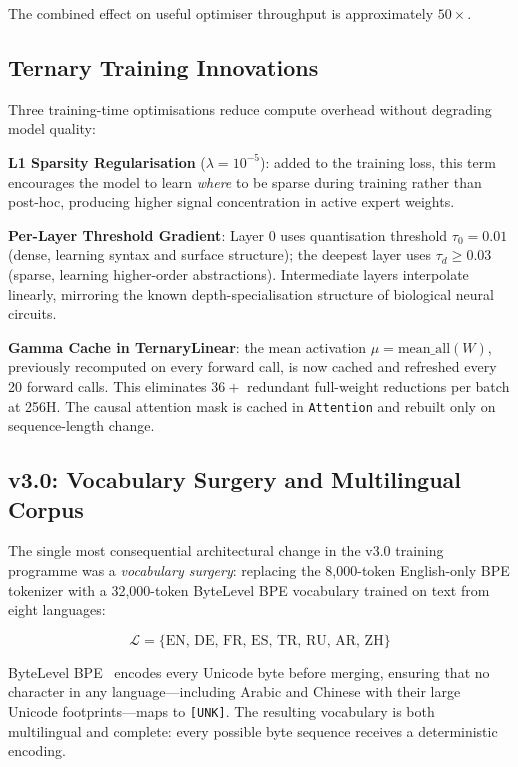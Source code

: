 \documentclass[11pt,a4paper]{article}
\begin{document}
The combined effect on useful optimiser throughput is approximately $50\times$.

\subsection{Ternary Training Innovations}

Three training-time optimisations reduce compute overhead without degrading
model quality:

\textbf{L1 Sparsity Regularisation} ($\lambda = 10^{-5}$): added to the
training loss, this term encourages the model to learn \emph{where} to be
sparse during training rather than post-hoc, producing higher signal
concentration in active expert weights.

\textbf{Per-Layer Threshold Gradient}: Layer 0 uses quantisation threshold
$\tau_0 = 0.01$ (dense, learning syntax and surface structure); the deepest
layer uses $\tau_d \geq 0.03$ (sparse, learning higher-order abstractions).
Intermediate layers interpolate linearly, mirroring the known depth-specialisation
structure of biological neural circuits.

\textbf{Gamma Cache in TernaryLinear}: the mean activation
$\mu = \mathrm{mean\_all}(W)$, previously recomputed on every forward call,
is now cached and refreshed every 20 forward calls. This eliminates $36{+}$
redundant full-weight reductions per batch at 256H. The causal attention mask is
cached in \texttt{Attention} and rebuilt only on sequence-length change.

\subsection{v3.0: Vocabulary Surgery and Multilingual Corpus}
\label{subsec:vocab_surgery}

The single most consequential architectural change in the v3.0 training programme
was a \emph{vocabulary surgery}: replacing the 8,000-token English-only BPE
tokenizer with a 32,000-token ByteLevel BPE vocabulary trained on text from eight
languages:

\begin{equation}
  \mathcal{L} = \{\text{EN, DE, FR, ES, TR, RU, AR, ZH}\}
  \label{eq:languages}
\end{equation}

ByteLevel BPE~\cite{radford2019language} encodes every Unicode byte before
merging, ensuring that no character in any language---including Arabic and Chinese
with their large Unicode footprints---maps to \texttt{[UNK]}. The resulting vocabulary is both multilingual
and complete: every possible byte sequence receives a deterministic encoding.
\end{document}

